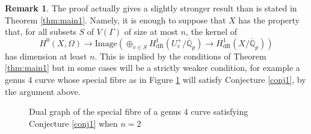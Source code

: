 \documentclass{amsart}
\def\Q{\mathbb Q}
\newcommand{\dR}{\mathrm{dR}}
\theoremstyle{plain}
\theoremstyle{definition}
\newtheorem{remark}{Remark}
\begin{document}
\begin{remark}
The proof actually gives a slightly stronger result than is stated in Theorem \ref{thm:main1}. Namely, it is enough to suppose that $X$ has the property that, for all subsets $S$ of $V(\Gamma )$ of size at most $n$, the kernel of \[
H^0 (X,\Omega )\to \mathrm{Image} (\oplus _{v\in S} H^1 _{\dR} (U_{v}^+ /\overline{\Q }_p)\to H^1 _{\dR}(X/\overline{\Q }_p))
\]
has dimension at least $n$. This is implied by the conditions of Theorem \ref{thm:main1} but in some cases will be a strictly weaker condition, for example a genus 4 curve whose special fibre as in Figure \ref{fig} will satisfy Conjecture \ref{conj1}, by the argument above.

\begin{figure}[h]
\begin{center}
\end{center}
\caption{Dual graph of the special fibre of a genus 4 curve satisfying Conjecture \ref{conj1} when $n=2$}
\label{fig}
\end{figure}
\end{remark}

%
%
%
%
%
%






\end{document}
